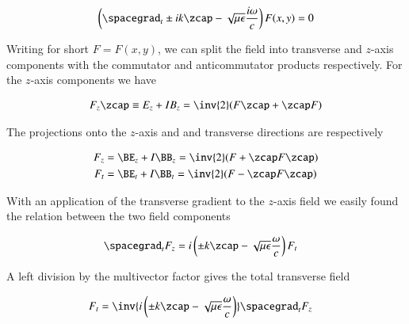 \begin{equation}\label{eqn:transverseField:summaryMax2}
\begin{aligned}
\left(\spacegrad_t \pm i k \zcap - \sqrt{\mu\epsilon}\frac{i\omega}{c}\right) F(x,y) = 0
\end{aligned}
\end{equation}

Writing for short \(F = F(x,y)\), we can split the field into transverse and \(z\)-axis components with the commutator and anticommutator products respectively.  For the \(z\)-axis components we have

\begin{equation}\label{eqn:transverseField:foo4}
\begin{aligned}
F_z \zcap \equiv E_z + I B_z = \inv{2} (F \zcap + \zcap F)
\end{aligned}
\end{equation}

The projections onto the \(z\)-axis and and transverse directions are respectively

\begin{equation}\label{eqn:transverseField:foo5}
\begin{aligned}
F_z &= \BE_z + I \BB_z = \inv{2} (F + \zcap F \zcap) \\
F_t &= \BE_t + I \BB_t = \inv{2} (F - \zcap F \zcap)
\end{aligned}
\end{equation}

With an application of the transverse gradient to the \(z\)-axis field we easily found the relation between the two field components

\begin{equation}\label{eqn:transverseField:foo6}
\begin{aligned}
\spacegrad_t F_z &= i \left( \pm k \zcap - \sqrt{\mu\epsilon}\frac{\omega}{c}\right) F_t
\end{aligned}
\end{equation}

A left division by the multivector factor gives the total transverse field

\begin{equation}\label{eqn:transverseField:foo7}
\begin{aligned}
F_t &= \inv{i \left( \pm k \zcap - \sqrt{\mu\epsilon}\frac{\omega}{c}\right) } \spacegrad_t F_z
\end{aligned}
\end{equation}

